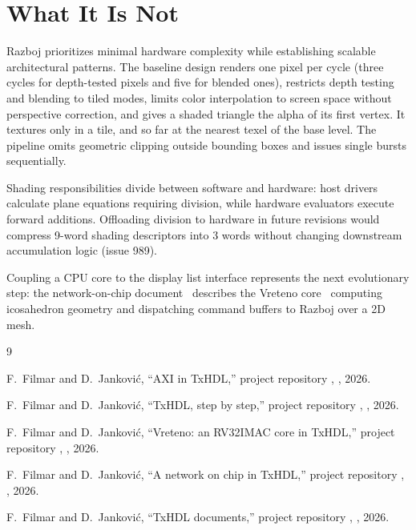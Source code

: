 \documentclass[journal,9pt]{IEEEtran}
\begin{document}
\section{What It Is Not}
\label{sec:g-not}

Razboj prioritizes minimal hardware complexity while establishing scalable
architectural patterns. The baseline design renders one pixel per cycle (three
cycles for depth-tested pixels and five for blended ones), restricts depth
testing and blending to tiled modes, limits color interpolation to screen
space without perspective correction, and gives a shaded triangle the alpha
of its first vertex. It textures only in a tile, and so far at the nearest
texel of the base level. The pipeline omits
geometric clipping outside bounding boxes and issues single bursts
sequentially.

Shading responsibilities divide between software and hardware: host drivers
calculate plane equations requiring division, while hardware evaluators
execute forward additions. Offloading division to hardware in future
revisions would compress 9-word shading descriptors into 3 words without
changing downstream accumulation logic (issue 989).

Coupling a CPU core to the display list interface represents the next
evolutionary step: the network-on-chip document~\cite{noc} describes the
Vreteno core~\cite{vreteno} computing icosahedron geometry and dispatching
command buffers to Razboj over a 2D mesh.

\begin{thebibliography}{9}

F.~Filmar and D.~Janković, ``AXI in TxHDL,'' project repository
, , 2026.

F.~Filmar and D.~Janković, ``TxHDL, step by step,'' project
repository , , 2026.

F.~Filmar and D.~Janković, ``Vreteno: an RV32IMAC core in TxHDL,''
project repository , , 2026.

F.~Filmar and D.~Janković, ``A network on chip in TxHDL,'' project
repository , , 2026.

F.~Filmar and D.~Janković, ``TxHDL documents,'' project repository
, , 2026.

\end{thebibliography}
\end{document}

